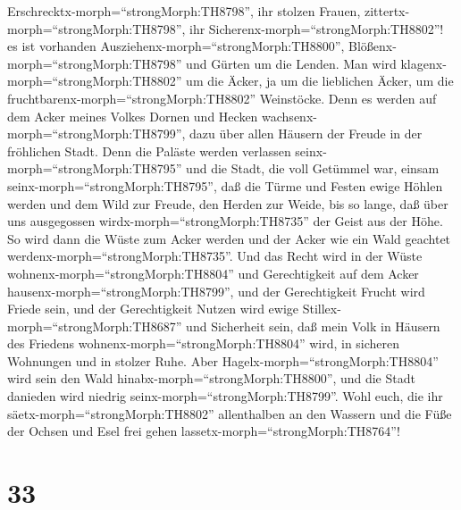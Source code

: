 Erschrecktx-morph=``strongMorph:TH8798'', ihr stolzen Frauen,
zittertx-morph=``strongMorph:TH8798'', ihr
Sicherenx-morph=``strongMorph:TH8802''! es ist vorhanden
Ausziehenx-morph=``strongMorph:TH8800'',
Blößenx-morph=``strongMorph:TH8798'' und Gürten um die Lenden.
 Man wird klagenx-morph=``strongMorph:TH8802'' um die
Äcker, ja um die lieblichen Äcker, um die
fruchtbarenx-morph=``strongMorph:TH8802'' Weinstöcke.  Denn
es werden auf dem Acker meines Volkes Dornen und Hecken
wachsenx-morph=``strongMorph:TH8799'', dazu über allen Häusern der
Freude in der fröhlichen Stadt.  Denn die Paläste werden
verlassen seinx-morph=``strongMorph:TH8795'' und die Stadt, die voll
Getümmel war, einsam seinx-morph=``strongMorph:TH8795'', daß die Türme
und Festen ewige Höhlen werden und dem Wild zur Freude, den Herden zur
Weide,  bis so lange, daß über uns ausgegossen
wirdx-morph=``strongMorph:TH8735'' der Geist aus der Höhe. So wird dann
die Wüste zum Acker werden und der Acker wie ein Wald geachtet
werdenx-morph=``strongMorph:TH8735''.  Und das Recht wird
in der Wüste wohnenx-morph=``strongMorph:TH8804'' und Gerechtigkeit auf
dem Acker hausenx-morph=``strongMorph:TH8799'',  und der
Gerechtigkeit Frucht wird Friede sein, und der Gerechtigkeit Nutzen wird
ewige Stillex-morph=``strongMorph:TH8687'' und Sicherheit sein,
 daß mein Volk in Häusern des Friedens
wohnenx-morph=``strongMorph:TH8804'' wird, in sicheren Wohnungen und in
stolzer Ruhe.  Aber Hagelx-morph=``strongMorph:TH8804''
wird sein den Wald hinabx-morph=``strongMorph:TH8800'', und die Stadt
danieden wird niedrig seinx-morph=``strongMorph:TH8799''. 
Wohl euch, die ihr säetx-morph=``strongMorph:TH8802'' allenthalben an
den Wassern und die Füße der Ochsen und Esel frei gehen
lassetx-morph=``strongMorph:TH8764''!

\hypertarget{section-32}{%
\section{33}\label{section-32}}

